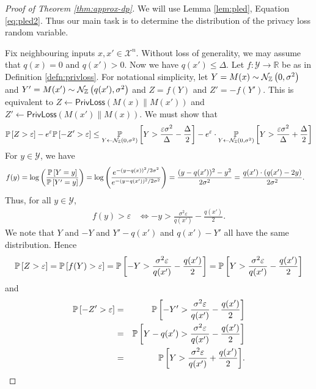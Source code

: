 \documentclass{jpcfinal} %
\newcommand{\dgausss}[2]{{\discN\left(#1,#2\right)}}
\newcommand{\dgauss}[1]{\dgausss{0}{#1}}
\newcommand{\pr}[2]{{\ifx&#1& \mathbb{P} \else
\underset{#1}{\mathbb{P}} \fi \left[#2\right]}}
\newcommand{\eps}{\varepsilon}
\newcommand{\privloss}[2]{\mathsf{PrivLoss}\left(#1\middle\|#2\right)}
\newcommand{\R}{\mathbb{R}}
\begin{document}
\begin{proof}[Proof of Theorem \ref{thm:approx-dp}]
We will use Lemma \ref{lem:pled}, Equation \ref{eq:pled2}. Thus
our main task is to determine the distribution of the privacy loss random variable.

Fix neighbouring inputs $x,x'\in\mathcal{X}^n$. Without loss of generality, we may assume that $q(x)=0$ and $q(x')>0$. Now we have $q(x')\le\Delta$.
Let $f : \mathcal{Y} \to \R$ be as in Definition \ref{defn:privloss}.
For notational simplicity, let $Y=M(x)\sim \dgauss{\sigma^2}$ and $Y'=M(x')\sim \dgausss{q(x')}{\sigma^2}$ and $Z=f(Y)$ and $Z'=-f(Y')$. This is equivalent to $Z \gets \privloss{M(x)}{M(x')}$ and $Z' \gets \privloss{M(x')}{M(x)}$.
We must show that $$\pr{}{Z>\eps}-e^\eps \pr{}{-Z'>\eps} \le \pr{Y \gets \dgauss{\sigma^2}}{Y > \frac{\eps \sigma^2}{\Delta} - \frac{\Delta}{2}} - e^\eps \cdot \pr{Y \gets \dgauss{\sigma^2}}{Y > \frac{\eps \sigma^2}{\Delta} + \frac{\Delta}{2}}$$
For $y \in \mathcal{Y}$, we have
\begin{align*}
    f(y) &= \log \left(\frac{\pr{}{Y=y}}{\pr{}{Y'=y}}\right)
    = \log \left(\frac{e^{-(y-q(x))^2/2\sigma^2}}{e^{-(y-q(x'))^2/2\sigma^2}}\right)
    = \frac{(y-q(x'))^2-y^2}{2\sigma^2}
    = \frac{q(x') \cdot (q(x') -2y)}{2\sigma^2}.
\end{align*}
Thus, for all $y \in \mathcal{Y}$,
\begin{align*}
    f(y) > \eps &\iff -y > \frac{\sigma^2\eps}{q(x')}-\frac{q(x')}{2}.
\end{align*}
We note that $Y$ and $-Y$ and $Y'-q(x')$ and $q(x')-Y'$ all have the same distribution. Hence
$$\pr{}{Z>\eps} = \pr{}{f(Y)>\eps} = \pr{}{-Y > \frac{\sigma^2\eps}{q(x')}-\frac{q(x')}{2}} = \pr{}{Y > \frac{\sigma^2\eps}{q(x')}-\frac{q(x')}{2}}$$
and
\begin{eqnarray*}
\pr{}{-Z'>\eps} & = & \pr{}{-Y' > \frac{\sigma^2\eps}{q(x')}-\frac{q(x')}{2}}\\
                & = & \pr{}{Y-q(x') > \frac{\sigma^2\eps}{q(x')}-\frac{q(x')}{2}} \\
                & = & \pr{}{Y > \frac{\sigma^2\eps}{q(x')}+\frac{q(x')}{2}}.
\end{eqnarray*}\qedhere
\end{proof}
\end{document}
